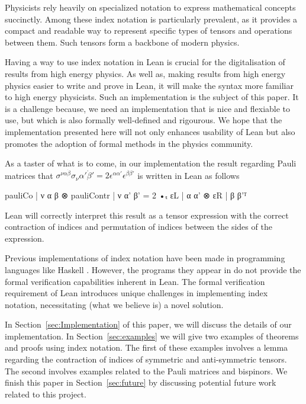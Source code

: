 \documentclass[a4paper, 11pt]{article}
\begin{document}
Physicists rely heavily on specialized notation to express mathematical concepts succinctly. 
Among these index notation is particularly prevalent,
 as it provides a compact and readable way to represent specific types of tensors and operations
 between them. Such tensors form a backbone of modern physics. 

Having a way to use index notation in Lean is crucial for the digitalisation of 
results from high energy physics. 
As well as, making results from high energy physics easier to write and prove in Lean, 
it will make the syntax more familiar to high energy physicists. 
Such an implementation is the subject of this paper. 
It is a challenge because, we need an implementation that is nice and flexiable to use, 
but which is also formally well-defined and rigourous. 
We hope that the implementation presented here will
not only enhances usability of Lean but also promotes the adoption of formal methods in the 
physics community.

As a taster of what is to come, in our implementation the result regarding Pauli matrices 
that $\sigma^{\nu \alpha \dot \beta}\sigma_\nu{ \alpha' \dot \beta'} = 2 \epsilon^{\alpha \alpha'}\epsilon^{\beta \beta'}$ 
is written in Lean as follows
\begin{code}
{pauliCo | ν α β ⊗ pauliContr | ν α' β' = 2 •ₜ εL | α α' ⊗ εR | β β'}ᵀ
\end{code}
Lean will correctly interpret this result as a tensor expression with the correct contraction of indices 
and permutation of indices between the sides of the expression.

Previous implementations of index notation have been made in programming languages like Haskell 
\cite{haskellPaper}. However, the programs they appear in do not
 provide the formal verification capabilities inherent in Lean. 
 The formal verification requirement of Lean introduces unique challenges in implementing index 
 notation, necessitating (what we believe is) a novel solution.

In Section~\ref{sec:Implementation} of this paper, we will discuss the details of our implementation. 
In Section~\ref{sec:examples} we will give two examples of theorems and proofs using index notation.
The first of these examples involves a lemma regarding the contraction of indices of symmetric and anti-symmetric tensors. 
The second involves examples related to the Pauli matrices and bispinors. 
We finish this paper in Section~\ref{sec:future} by discussing potential future work related to this project.
\end{document}
